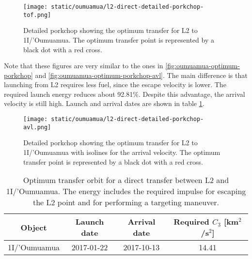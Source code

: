 \begin{figure}[H]
  \centering
  \texttt{[image: static/oumuamua/l2-direct-detailed-porkchop-tof.png]}
  \caption[Detailed porkchop showing the optimum transfer for
    L2 to 1I/'Oumuamua with the time of flight.]{Detailed porkchop showing the optimum transfer for
    L2 to 1I/'Oumuamua. The optimum transfer point is represented by a black dot
    with a red cross.
  }
  \label{fig:l2-oumuamua-optimum-porkchop}
\end{figure}

Note that these figures are very similar to the ones in
\ref{fig:oumuamua-optimum-porkchop} and \ref{fig:oumuamua-optimum-porkchop-avl}.
The main difference is that launching from L2 requires less fuel, since the
escape velocity is lower. The required launch energy reduces about 92.81\%.
Despite this advantage, the arrival velocity is still high. Launch and arrival
dates are shown in table \ref{tab:l2-oumuamua-direct-transfer-optimum}.

\begin{figure}[H]
  \centering
  \texttt{[image: static/oumuamua/l2-direct-detailed-porkchop-avl.png]}
  \caption[Detailed porkchop showing the optimum transfer for
    L2 to 1I/'Oumuamua with the arrival velocity.]{Detailed porkchop showing the
    optimum transfer for L2 to 1I/'Oumuamua with isolines for the arrival
    velocity. The optimum transfer point is represented by a black dot
    with a red cross.
  }
  \label{fig:l2-oumuamua-optimum-porkchop-avl}
\end{figure}

\vspace{1cm}
\begin{table}[H]
  \centering
  \begin{tabular}{|c|c|c|c|}
    \hline
    Object       & Launch date & Arrival date & Required $C_3$ [km$^2$/s$^2$] \\
    \hline
    1I/'Oumuamua & 2017-01-22  & 2017-10-13   & 14.41                         \\
    \hline
  \end{tabular}
  \caption[Optimum transfer orbit for a direct transfer between L2 and
    1I/'Oumuamua.]{Optimum transfer orbit for a direct transfer between
    L2 and 1I/'Oumuamua. The energy includes the required impulse for
    escaping the L2 point and for performing a targeting maneuver.}
  \label{tab:l2-oumuamua-direct-transfer-optimum}
\end{table}

